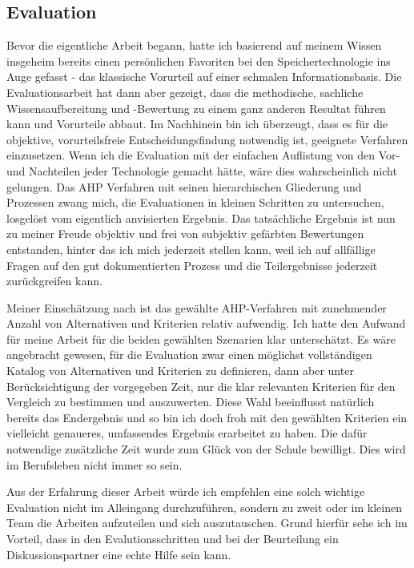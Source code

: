 \subsection*{Evaluation}
Bevor die eigentliche Arbeit begann, hatte ich basierend auf meinem Wissen insgeheim bereits einen persönlichen Favoriten bei den Speichertechnologie ins Auge gefasst - das klassische Vorurteil auf einer schmalen Informationsbasis. Die Evaluationsarbeit hat dann aber gezeigt, dass die methodische, sachliche Wissensaufbereitung und -Bewertung zu einem ganz anderen Resultat führen kann und Vorurteile abbaut. Im Nachhinein bin ich überzeugt, dass es für die objektive, vorurteilsfreie Entscheidungsfindung notwendig ist, geeignete Verfahren einzusetzen. Wenn ich die Evaluation mit der einfachen Auflistung von den Vor- und Nachteilen jeder Technologie gemacht hätte, wäre dies wahrscheinlich nicht gelungen. Das AHP Verfahren mit seinen hierarchischen Gliederung und Prozessen zwang mich, die Evaluationen in kleinen Schritten zu untersuchen, losgelöst vom eigentlich anvisierten Ergebnis. Das tatsächliche Ergebnis ist nun zu meiner Freude objektiv und frei von subjektiv gefärbten Bewertungen entstanden, hinter das ich mich jederzeit stellen kann, weil ich auf allfällige Fragen auf den gut dokumentierten Prozess und die Teilergebnisse jederzeit zurückgreifen kann. 

Meiner Einschätzung nach ist das gewählte AHP-Verfahren mit zunehmender Anzahl von Alternativen und Kriterien relativ aufwendig. Ich hatte den Aufwand für meine Arbeit für die beiden gewählten Szenarien klar unterschätzt. Es wäre angebracht gewesen, für die Evaluation zwar einen möglichst vollständigen Katalog von Alternativen und Kriterien zu definieren, dann aber unter Berücksichtigung der vorgegeben Zeit, nur die klar relevanten Kriterien für den Vergleich zu bestimmen und auszuwerten. Diese Wahl beeinflusst natürlich bereits das Endergebnis und so bin ich doch froh mit den gewählten Kriterien ein vielleicht genaueres, umfassendes Ergebnis erarbeitet zu haben. Die dafür notwendige zusätzliche Zeit wurde zum Glück von der Schule bewilligt. Dies wird im Berufsleben nicht immer so sein.

Aus der Erfahrung dieser Arbeit würde ich empfehlen eine solch wichtige Evaluation nicht im Alleingang durchzuführen, sondern zu zweit oder im kleinen Team die Arbeiten aufzuteilen und sich auszutauschen. Grund hierfür sehe ich im Vorteil, dass in den Evalutionsschritten und bei der Beurteilung ein Diskussionspartner eine echte Hilfe sein kann.

